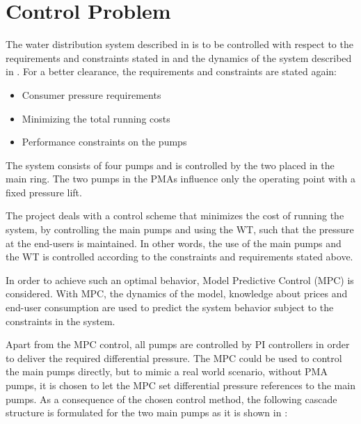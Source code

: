 \section{Control Problem}
\label{control_problem}
The water distribution system described in  is to be controlled with respect to the requirements and constraints stated in  and the dynamics of the system described in . For a better clearance, the requirements and constraints are stated again: 
\begin{itemize}
	\item Consumer pressure requirements %
%
	\item Minimizing the total running costs
%
	\item Performance constraints on the pumps
\end{itemize}
The system consists of four pumps and is controlled by the two placed in the main ring. The two pumps in the PMAs influence only the operating point with a fixed pressure lift. 

The project deals with a control scheme that minimizes the cost of running the system, by controlling the main pumps and using the WT, such that the pressure at the end-users is maintained. In other words, the use of the main pumps and the WT is controlled according to the constraints and requirements stated above. 

In order to achieve such an optimal behavior, Model Predictive Control (MPC) is considered. With MPC, the dynamics of the model, knowledge about prices and end-user consumption are used to predict the system behavior subject to the constraints in the system. 

Apart from the MPC control, all pumps are controlled by PI controllers in order to deliver the required differential pressure. The MPC could be used to control the main pumps directly, but to mimic a real world scenario, without PMA pumps, it is chosen to let the MPC set differential pressure references to the main pumps. As a consequence of the chosen control method, the following cascade structure is formulated for the two main pumps as it is shown in : 

